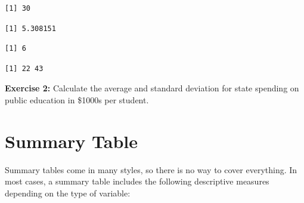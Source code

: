 \documentclass[
]{book}
\makeatletter
\newenvironment{Shaded}{\begin{snugshade}}{\end{snugshade}}
\newcommand{\FunctionTok}[1]{\textcolor[rgb]{0,0,0}{#1}}
\newcommand{\NormalTok}[1]{#1}
\newcommand{\SpecialCharTok}[1]{\textcolor[rgb]{0,0,0}{#1}}
\newenvironment{kframe}{%
\medskip{}
\setlength{\fboxsep}{.8em}
 \def\at@end@of@kframe{}%
 \ifinner\ifhmode%
  \def\at@end@of@kframe{\end{minipage}}%
  \begin{minipage}{\columnwidth}%
 \fi\fi%
 \def\FrameCommand##1{\hskip\@totalleftmargin \hskip-\fboxsep
 \colorbox{shadecolor}{##1}\hskip-\fboxsep
     \hskip-\linewidth \hskip-\@totalleftmargin \hskip\columnwidth}%
 \MakeFramed {\advance\hsize-\width
   \@totalleftmargin\z@ \linewidth\hsize
   \@setminipage}}%
 {\par\unskip\endMakeFramed%
 \at@end@of@kframe}
\renewenvironment{Shaded}{\begin{kframe}}{\end{kframe}}
\newenvironment{rmdblock}[1]
  {\begin{shaded*}
  }
  {\end{shaded*}
  }
\newenvironment{learncheck}
  {\begin{rmdblock}{warning}}
  {\end{rmdblock}}
\makeatother
\begin{document}
\begin{verbatim}
[1] 30
\end{verbatim}

\begin{Shaded}
\end{Shaded}

\begin{verbatim}
[1] 5.308151
\end{verbatim}

\begin{Shaded}
\end{Shaded}

\begin{verbatim}
[1] 6
\end{verbatim}

\begin{Shaded}
\end{Shaded}

\begin{verbatim}
[1] 22 43
\end{verbatim}

\begin{learncheck}
\textbf{Exercise 2:} Calculate the average and standard deviation for
state spending on public education in \$1000s per student.
\end{learncheck}

\hypertarget{summary-table}{%
\section{Summary Table}\label{summary-table}}

Summary tables come in many styles, so there is no way to cover everything. In most cases, a summary table includes the following descriptive measures depending on the type of variable:
\end{document}
